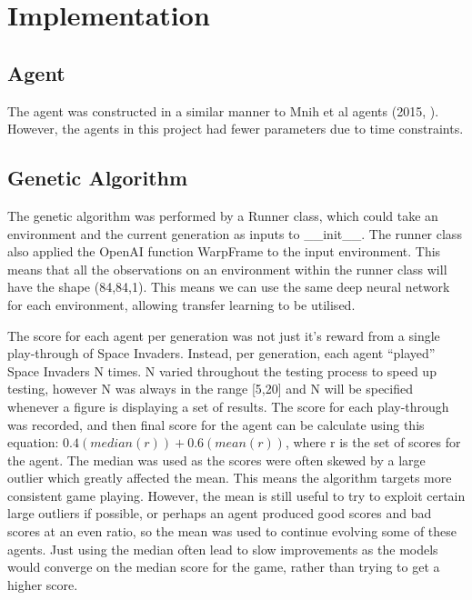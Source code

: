 \chapter{Implementation}

\section{Agent}

The agent was constructed in a similar manner to Mnih et al agents (2015, \cite{mnih}). However, the agents in this project had fewer parameters due to time constraints.

\section{Genetic Algorithm}

The genetic algorithm was performed by a Runner class, which could take an environment and the current generation as inputs to \_\_init\_\_. The runner class also applied the OpenAI function WarpFrame to the input environment. This means that all the observations on an environment within the runner class will have the shape (84,84,1). This means we can use the same deep neural network for each environment, allowing transfer learning to be utilised.

The score for each agent per generation was not just it's reward from a single play-through of Space Invaders. Instead, per generation, each agent ``played'' Space Invaders N times. N varied throughout the testing process to speed up testing, however N was always in the range [5,20] and N will be specified whenever a figure is displaying a set of results. The score for each play-through was recorded, and then final score for the agent can be calculate using this equation: $0.4(median(r)) + 0.6(mean(r))$, where r is the set of scores for the agent. The median was used as the scores were often skewed by a large outlier which greatly affected the mean. This means the algorithm targets more consistent game playing. However, the mean is still useful to try to exploit certain large outliers if possible, or perhaps an agent produced good scores and bad scores at an even ratio, so the mean was used to continue evolving some of these agents. Just using the median often lead to slow improvements as the models would converge on the median score for the game, rather than trying to get a higher score.

